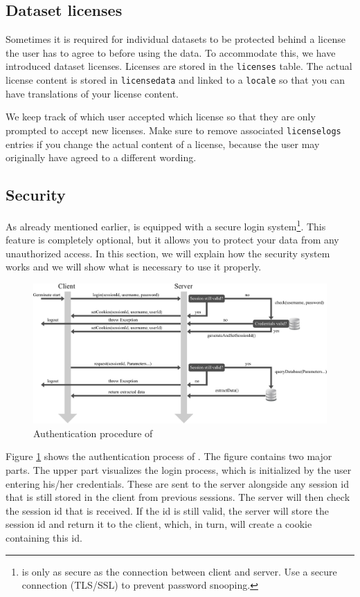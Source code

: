 \subsection{Dataset licenses}
Sometimes it is required for individual datasets to be protected behind a license the user has to agree to before using the data. To accommodate this, we have introduced dataset licenses. Licenses are stored in the \texttt{licenses} table. The actual license content is stored in \texttt{licensedata} and linked to a \texttt{locale} so that you can have translations of your license content.

We keep track of which user accepted which license so that they are only prompted to accept new licenses. Make sure to remove associated \texttt{licenselogs} entries if you change the actual content of a license, because the user may originally have agreed to a different wording.

\subsection{Security}
\label{sec:example_security}
As already mentioned earlier, {\germinate} is equipped with a secure login system\footnote{{\germinate} is only as secure as the connection between client and server. Use a secure connection (TLS/SSL) to prevent password snooping.}. This feature is completely optional, but it allows you to protect your data from any unauthorized access. In this section, we will explain how the security system works and we will show what is necessary to use it properly.

\begin{figure}[h]
    \centering
    \includegraphics[scale=0.5]{img/examples/authentication.pdf}
    \caption{Authentication procedure of {\germinate}}
    \label{fig:authentication}
\end{figure}

Figure \ref{fig:authentication} shows the authentication process of {\germinate}. The figure contains two major parts. The upper part visualizes the login process, which is initialized by the user entering his/her credentials. These are sent to the server alongside any session id that is still stored in the client from previous sessions. The server will then check the session id that is received. If the id is still valid, the server will store the session id and return it to the client, which, in turn, will create a cookie containing this id.

